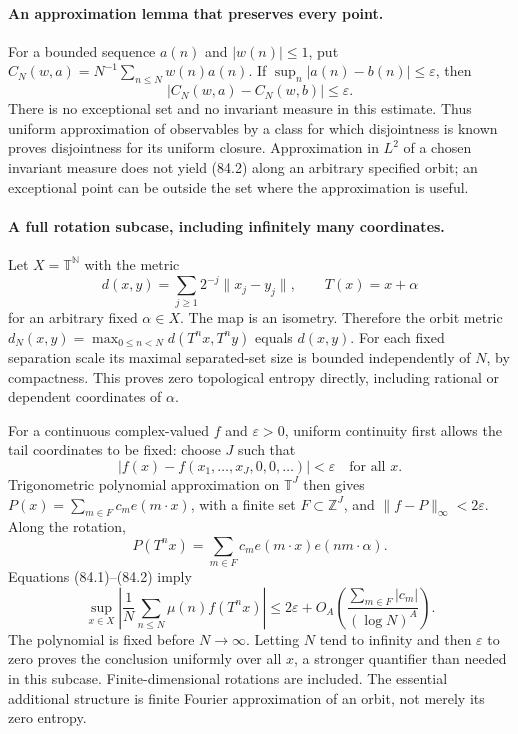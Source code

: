\documentclass[11pt]{article}
\begin{document}
\paragraph{An approximation lemma that preserves every point.}
For a bounded sequence $a(n)$ and $|w(n)|\leq1$, put
$C_N(w,a)=N^{-1}\sum_{n\leq N}w(n)a(n)$. If
$\sup_n|a(n)-b(n)|\leq\varepsilon$, then
\[
                  |C_N(w,a)-C_N(w,b)|\leq\varepsilon.  \tag{84.2}
\]
There is no exceptional set and no invariant measure in this estimate.
Thus uniform approximation of observables by a class for which disjointness
is known proves disjointness for its uniform closure. Approximation in
$L^2$ of a chosen invariant measure does not yield (84.2) along an arbitrary
specified orbit; an exceptional point can be outside the set where the
approximation is useful.

\paragraph{A full rotation subcase, including infinitely many coordinates.}
Let $X=\mathbb T^{\mathbb N}$ with the metric
\[
 d(x,y)=\sum_{j\geq1}2^{-j}\|x_j-y_j\|,
 \qquad T(x)=x+\alpha
\]
for an arbitrary fixed $\alpha\in X$. The map is an isometry. Therefore
the orbit metric $d_N(x,y)=\max_{0\leq n<N}d(T^nx,T^ny)$ equals $d(x,y)$.
For each fixed separation scale its maximal separated-set size is bounded
independently of $N$, by compactness. This proves zero topological entropy
directly, including rational or dependent coordinates of $\alpha$.

For a continuous complex-valued $f$ and $\varepsilon>0$, uniform continuity
first allows the tail coordinates to be fixed: choose $J$ such that
\[
 |f(x)-f(x_1,\ldots,x_J,0,0,\ldots)|<\varepsilon
 \quad\text{for all }x.
\]
Trigonometric polynomial approximation on $\mathbb T^J$ then gives
$P(x)=\sum_{m\in F}c_m e(m\cdot x)$, with a finite set
$F\subset\mathbb Z^J$, and $\|f-P\|_\infty<2\varepsilon$.
Along the rotation,
\[
 P(T^nx)=\sum_{m\in F}c_m e(m\cdot x)e(nm\cdot\alpha).
\]
Equations (84.1)--(84.2) imply
\[
 \sup_{x\in X}\left|\frac1N\sum_{n\leq N}\mu(n)f(T^nx)\right|
 \leq2\varepsilon+O_A\left(
          \frac{\sum_{m\in F}|c_m|}{(\log N)^A}\right). \tag{84.3}
\]
The polynomial is fixed before $N\to\infty$. Letting $N$ tend to infinity
and then $\varepsilon$ to zero proves the conclusion uniformly over all
$x$, a stronger quantifier than needed in this subcase. Finite-dimensional
rotations are included. The essential additional structure is finite
Fourier approximation of an orbit, not merely its zero entropy.
\end{document}
